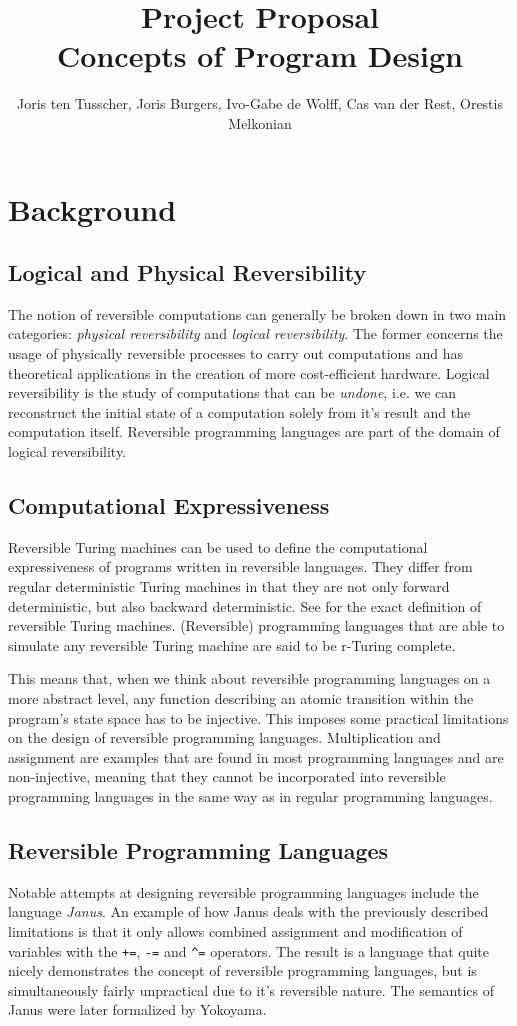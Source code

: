 \documentclass[12pt,a4paper]{article}
\title{\textbf{Project Proposal \\ \small{Concepts of Program Design}}}
\author{\small{Joris ten Tusscher, Joris Burgers, Ivo-Gabe de Wolff, Cas van der Rest, Orestis Melkonian}}
\date{}
\newcommand{\code}[1]{\texttt{#1}}
\begin{document}
\maketitle

\section{Background}
\subsection{Logical and Physical Reversibility}
	The notion of reversible computations can generally be broken down in two main categories: \textit{physical reversibility} and \textit{logical reversibility}. The former concerns the usage of physically reversible processes to carry out computations and has theoretical applications in the creation of more cost-efficient hardware\cite{frank05}. Logical reversibility is the study of computations that can be \textit{undone}, i.e. we can reconstruct the initial state of a computation solely from it's result and the computation itself. Reversible programming languages are part of the domain of logical reversibility. 
\subsection{Computational Expressiveness}
Reversible Turing machines can be used to define the computational expressiveness of programs written in reversible languages. They differ from regular deterministic Turing machines in that they are not only forward deterministic, but also backward deterministic. See \cite{axelsen11} for the exact definition of reversible Turing machines. (Reversible) programming languages that are able to simulate any reversible Turing machine are said to be r-Turing complete.

This means that, when we think about reversible programming languages on a more abstract level, any function describing an atomic transition within the program's state space has to be injective. This imposes some practical limitations on the design of reversible programming languages. Multiplication and assignment are examples that are found in most programming languages and are non-injective, meaning that they cannot be incorporated into reversible programming languages in the same way as in regular programming languages.  

\subsection{Reversible Programming Languages}
Notable attempts at designing reversible programming languages include the language \textit{Janus}\cite{lutz82}. An example of how Janus deals with the previously described limitations is that it only allows combined assignment and modification of variables with the \code{+=}, \code{-=} and \code{^=} operators. The result is a language that quite nicely demonstrates the concept of reversible programming languages, but is simultaneously fairly unpractical due to it's reversible nature. The semantics of Janus were later formalized by Yokoyama\cite{yokoyama10}.
\end{document}
